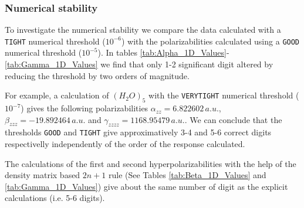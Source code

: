 \documentclass[prl,aps,twocolumn,showpacs,twocolumngrid,superbib]{revtex4}
\begin{document}
\subsubsection{Numerical stability}

To investigate the numerical stability we compare the data calculated
with a {\tt TIGHT} numerical threshold ($10^{-6}$) with the polarizabilities
calculated using a {\tt GOOD} numerical threshold ($10^{-5}$). 
In tables \ref{tab:Alpha_1D_Values}-\ref{tab:Gamma_1D_Values} we find that
only 1-2 significant digit altered by reducing the threshold by two orders 
of magnitude. 

For example, a calculation of $(H_2O)_5$ with the {\tt VERYTIGHT} numerical threshold ($10^{-7}$) 
gives the following polarizabilities $\alpha_{zz}=6.822602\,a.u.$, $\beta_{zzz}=-19.892464\,a.u.$ and
$\gamma_{zzzz}=1168.95479\,a.u.$. We can conclude that the thresholds 
{\tt GOOD} and {\tt TIGHT} give approximatively 3-4 and 5-6 
correct digits respectivelly independently of the order of the response calculated.

The calculations of the first and second hyperpolarizabilities with the help of
the density matrix based $2n+1$ rule (See Tables \ref{tab:Beta_1D_Values} and \ref{tab:Gamma_1D_Values}) 
give about the same number of digit as the explicit calculations (i.e. 5-6 digits).



\end{document}
